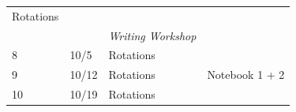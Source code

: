 \documentclass[]{tufte-book}
\begin{document}
\begin{longtable}[]{@{}llll@{}}
\begin{minipage}[t]{0.32\columnwidth}
Rotations\strut
\end{minipage} & \begin{minipage}[t]{0.40\columnwidth}\raggedright
\strut
\end{minipage}\tabularnewline
\begin{minipage}[t]{0.04\columnwidth}\raggedright
\strut
\end{minipage} & \begin{minipage}[t]{0.13\columnwidth}\raggedright
\strut
\end{minipage} & \begin{minipage}[t]{0.32\columnwidth}\raggedright
\emph{Writing Workshop}\strut
\end{minipage} & \begin{minipage}[t]{0.40\columnwidth}\raggedright
\strut
\end{minipage}\tabularnewline
\begin{minipage}[t]{0.04\columnwidth}\raggedright
8\strut
\end{minipage} & \begin{minipage}[t]{0.13\columnwidth}\raggedright
10/5\strut
\end{minipage} & \begin{minipage}[t]{0.32\columnwidth}\raggedright
Rotations\strut
\end{minipage} & \begin{minipage}[t]{0.40\columnwidth}\raggedright
\strut
\end{minipage}\tabularnewline
\begin{minipage}[t]{0.04\columnwidth}\raggedright
9\strut
\end{minipage} & \begin{minipage}[t]{0.13\columnwidth}\raggedright
10/12\strut
\end{minipage} & \begin{minipage}[t]{0.32\columnwidth}\raggedright
Rotations\strut
\end{minipage} & \begin{minipage}[t]{0.40\columnwidth}\raggedright
Notebook 1 + 2\strut
\end{minipage}\tabularnewline
\begin{minipage}[t]{0.04\columnwidth}\raggedright
10\strut
\end{minipage} & \begin{minipage}[t]{0.13\columnwidth}\raggedright
10/19\strut
\end{minipage} & \begin{minipage}[t]{0.32\columnwidth}\raggedright
Rotations\strut

\end{minipage}
\end{longtable}
\end{document}
